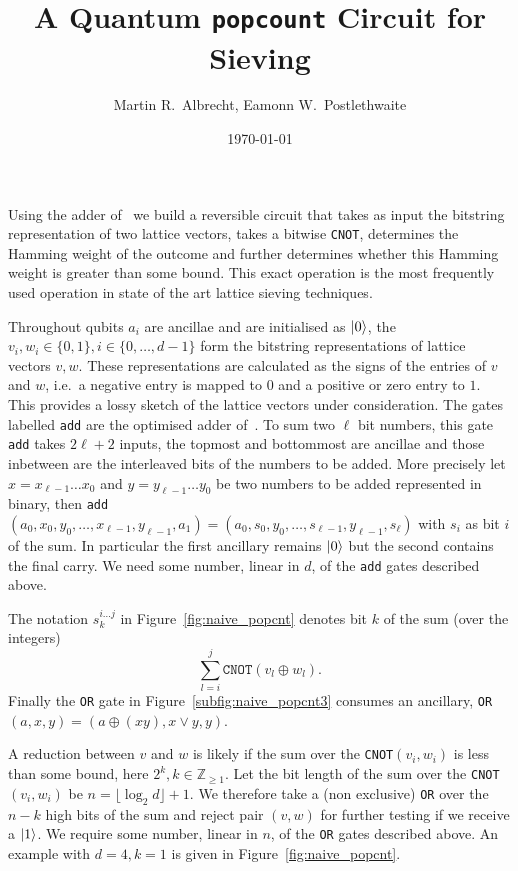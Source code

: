 \documentclass[notitlepage]{report}
\title{A Quantum \texttt{popcount} Circuit for Sieving}
\author{Martin R.~Albrecht, Eamonn W.~Postlethwaite}
\date{\today}
\theoremstyle{definition}
\begin{document}
\maketitle

Using the adder of~\cite{cuccaro2004new} we build a reversible circuit that takes as input the bitstring representation of two lattice vectors, takes a bitwise \texttt{CNOT}, determines the Hamming weight of the outcome and further determines whether this Hamming weight is greater than some bound.
This exact operation is the most frequently used operation in state of the art lattice sieving techniques.

Throughout qubits $a_{i}$ are ancillae and are initialised as $\ket{0}$, the $v_{i}, w_{i} \in \{0, 1\}, i \in \{0, \dots, d - 1\}$ form the bitstring representations of lattice vectors $v, w$.
These representations are calculated as the signs of the entries of $v$ and $w$, i.e.~a negative entry is mapped to $0$ and a positive or zero entry to $1$.
This provides a lossy sketch of the lattice vectors under consideration.
The gates labelled \texttt{add} are the optimised adder of~\cite{cuccaro2004new}.
To sum two $\ell$ bit numbers, this gate \texttt{add} takes $2\ell + 2$ inputs, the topmost and bottommost are ancillae and those inbetween are the interleaved bits of the numbers to be added.
More precisely let $x = x_{\ell-1}\dots x_{0}$ and $y = y_{\ell-1}\dots y_{0}$ be two numbers to be added represented in binary, then \texttt{add}$(a_{0}, x_{0}, y_{0}, \dots, x_{\ell-1}, y_{\ell-1}, a_{1}) = (a_{0}, s_{0}, y_{0}, \dots, s_{\ell-1}, y_{\ell-1}, s_{\ell})$ with $s_{i}$ as bit $i$ of the sum.
In particular the first ancillary remains $\ket{0}$ but the second contains the final carry.
We need some number, linear in $d$, of the \texttt{add} gates described above.

The notation $s^{i\dots j}_{k}$ in Figure~\ref{fig:naive_popcnt} denotes bit $k$ of the sum (over the integers)
\[
    \displaystyle\sum\limits_{l=i}^{j}{\texttt{CNOT}(v_{l} \oplus w_{l})}.
\]
Finally the \texttt{OR} gate in Figure~\ref{subfig:naive_popcnt3} consumes an ancillary, \texttt{OR}$(a, x, y) = (a \oplus (xy), x\vee y, y)$.

A reduction between $v$ and $w$ is likely if the sum over the \texttt{CNOT}$(v_{i}, w_{i})$ is less than some bound, here $2^{k}, k \in \mathbb{Z}_{\geq 1}$.
Let the bit length of the sum over the \texttt{CNOT}$(v_{i}, w_{i})$ be $n = \lfloor\log_{2}d\rfloor + 1$.
We therefore take a (non exclusive) \texttt{OR} over the $n - k$ high bits of the sum and reject pair $(v, w)$ for further testing if we receive a $\ket{1}$.
We require some number, linear in $n$, of the \texttt{OR} gates described above.
An example with $d = 4, k = 1$ is given in Figure~\ref{fig:naive_popcnt}.
\end{document}
